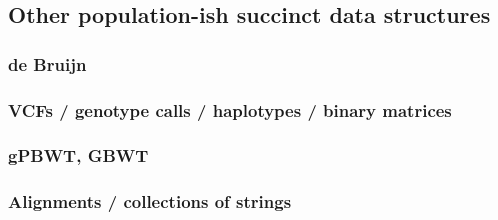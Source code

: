 \subsection{Other population-ish succinct data structures}

\subsubsection{de Bruijn}


\subsubsection{VCFs / genotype calls / haplotypes / binary matrices}

\subsubsection{gPBWT, GBWT}



\subsubsection{Alignments / collections of strings}




